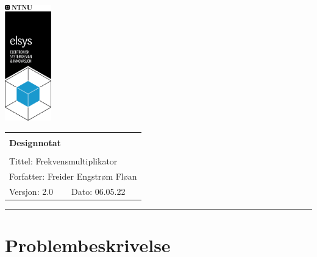 \documentclass[a4paper,11pt,norsk]{article}
\begin{document}
\begin{minipage}[c]{0.15\textwidth}
\includegraphics[width=2.0cm]{D1/Images/elsys_pos_staaende_ntnu.png}  
\end{minipage}
\begin{minipage}[c]{0.85\textwidth}

\renewcommand{\arraystretch}{1.7}
\large 
\begin{tabularx}{\textwidth}{|X|X|}
\hline
\multicolumn{2}{|l|}{} \\
\multicolumn{2}{|l|}{\huge \textbf{Designnotat}} \\
\multicolumn{2}{|l|}{}  \\
\hline
\multicolumn{2}{|l|}{Tittel: 
Frekvensmultiplikator
} \\
\hline
\multicolumn{2}{|l|}{Forfatter: 
Freider Engstrøm Fløan
} \\
\hline
Versjon: 2.0 & Dato: 06.05.22
\\
\hline 
\end{tabularx}
\end{minipage}
\normalsize


\setlength{\parskip}{0ex}
\renewcommand{\baselinestretch}{0.1}\normalsize
\tableofcontents
\renewcommand{\baselinestretch}{1.00}\normalsize
\setlength{\parskip}{2ex}
\rule{\textwidth}{1pt}
\label{sec:innledning}

\newpage



\section{Problembeskrivelse}
\label{sec:problembeskrivelse}
\end{document}
